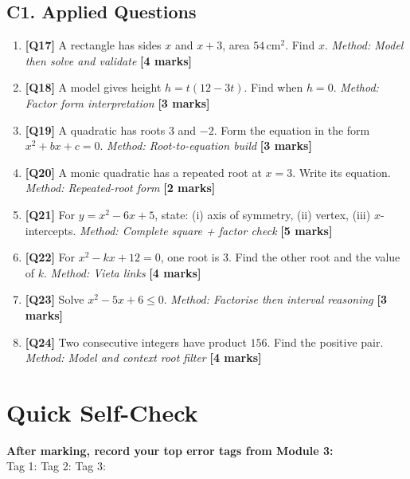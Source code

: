 \documentclass[11pt,a4paper]{article}
\newcommand{\QID}[1]{\textcolor{MPrimary}{\textbf{[#1]}}}
\newcommand{\Method}[1]{\textcolor{MMuted}{\textit{Method: #1}}}
\newcommand{\Marks}[1]{\hfill\textcolor{MMuted}{\textbf{[#1 marks]}}}
\newcommand{\AnswerSpace}{%
  \begin{tcolorbox}[masterycard,colback=white,height=12mm]
  \end{tcolorbox}
}
\begin{document}
\subsection*{C1. Applied Questions}
\begin{enumerate}[start=17,leftmargin=1.5em,itemsep=8pt]
  \item \QID{Q17} A rectangle has sides \(x\) and \(x+3\), area \(54\,\text{cm}^2\). Find \(x\). \Method{Model then solve and validate} \Marks{4}
  \AnswerSpace

  \item \QID{Q18} A model gives height \(h=t(12-3t)\). Find when \(h=0\). \Method{Factor form interpretation} \Marks{3}
  \AnswerSpace

  \item \QID{Q19} A quadratic has roots \(3\) and \(-2\). Form the equation in the form \(x^2+bx+c=0\). \Method{Root-to-equation build} \Marks{3}
  \AnswerSpace

  \item \QID{Q20} A monic quadratic has a repeated root at \(x=3\). Write its equation. \Method{Repeated-root form} \Marks{2}
  \AnswerSpace

  \item \QID{Q21} For \(y=x^2-6x+5\), state: (i) axis of symmetry, (ii) vertex, (iii) \(x\)-intercepts. \Method{Complete square + factor check} \Marks{5}
  \AnswerSpace

  \item \QID{Q22} For \(x^2-kx+12=0\), one root is \(3\). Find the other root and the value of \(k\). \Method{Vieta links} \Marks{4}
  \AnswerSpace

  \item \QID{Q23} Solve \(x^2-5x+6\le0\). \Method{Factorise then interval reasoning} \Marks{3}
  \AnswerSpace

  \item \QID{Q24} Two consecutive integers have product \(156\). Find the positive pair. \Method{Model and context root filter} \Marks{4}
  \AnswerSpace
\end{enumerate}

\section{Quick Self-Check}
\begin{tcolorbox}[masterycard,colback=MSoft]
\textbf{After marking, record your top error tags from Module 3:} \\
Tag 1: \underline{\hspace{3.2cm}}\quad
Tag 2: \underline{\hspace{3.2cm}}\quad
Tag 3: \underline{\hspace{3.2cm}}
\end{tcolorbox}
\end{document}
